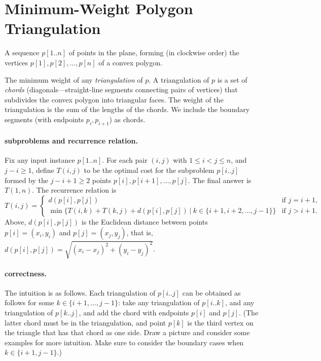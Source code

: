 
\section{Minimum-Weight Polygon Triangulation}\label{dp: sec: MWT}

\begin{mylist}
\item[\bf input:]
  A sequence $p[1..n]$ of points in the plane,
  forming (in clockwise order) the vertices
  $p[1], p[2], \ldots, p[n]$ of a convex polygon.

\item[\bf output:]
  The minimum weight of any \emph{triangulation} of $p$.
  A triangulation of $p$ is a set of \emph{chords}
  (diagonals---straight-line segments connecting pairs of vertices)
  that subdivides the convex polygon into triangular faces.
  The weight of the triangulation is the sum of the lengths of the chords.
  We include the boundary segments (with endpoints $p_i, p_{i+1}$)
  as chords.
\end{mylist}

\paragraph{subproblems and recurrence relation.}
Fix any input instance $p[1..n]$.
For each pair $(i, j)$ with $1 \le i < j\le n$, and $j-i \ge 1$,
define $T(i, j)$ to be the optimal cost for the subproblem
$p[i..j]$ formed by the $j-i+1 \ge 2$ points $p[i], p[i+1], \ldots, p[j]$.
The final answer is $T(1, n)$.
The recurrence relation is
\[
  T(i, j) = \begin{cases}
    d(p[i], p[j]) & \text{if } j=i+1, \\
    \min\Big\{ T(i, k) + T(k, j) + d(p[i], p[j]) ~\big|~ k\in \{i+1, i+2, \ldots, j-1\} \Big\} & \text{if } j > i+1.
  \end{cases}
\]
Above, $d(p[i], p[j])$ is the Euclidean distance between points $p[i] = (x_i, y_i)$ and $p[j] = (x_j ,y_j)$,
that is, $d(p[i], p[j]) = \sqrt{(x_i-x_j)^2 + (y_i-y_j)^2}$.

\paragraph{correctness.}
The intuition is as follows.
Each triangulation of $p[i..j]$ can be obtained as follows
for some $k\in\{i+1,\ldots,j-1\}$:
take any triangulation of $p[i..k]$,
and any triangulation of $p[k..j]$,
and add the chord with endpoints $p[i]$ and $p[j]$.
(The latter chord must be in the triangulation,
and point $p[k]$ is the third vertex on the triangle
that has that chord as one side.
Draw a picture and consider some examples for more intuition.
Make sure to consider the boundary cases when $k\in\{i+1, j-1\}$.)

